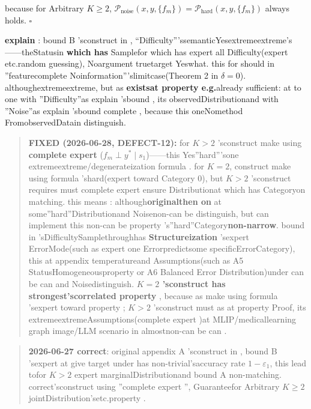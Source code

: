 \documentclass[
  12pt,
]{article}
\begin{document}
because for Arbitrary
\(K \geq 2\), \(\mathcal{P}_{\text{noise}}(x, y, \{f_m\}) = \mathcal{P}_{\text{hard}}(x, y, \{f_m\})\)
always holds. \(\square\)

\textbf{explain }: bound  B
'sconstruct in , ``Difficulty'''ssemanticYesextremeextreme's------theStatusin \textbf{which has }Samplefor which has expert all Difficulty(expert etc.random guessing), Noargument truetarget Yeswhat. this for should in ''featurecomplete Noinformation'''slimitcase(Theorem
2 in 
\(\delta = 0\)). althoughextremeextreme, but as \textbf{existsat property e.g.}already sufficient: at to one with ''Difficulty''as explain 'sbound , its observedDistributionand with ''Noise''as explain 'sbound complete , because this oneNomethod FromobservedDatain distinguish. 

\begin{quote}
\textbf{FIXED (2026-06-28, DEFECT-12):} for  \(K>2\)
'sconstruct make using \textbf{complete expert }(\(f_m \perp y^* \mid s_1\))------this Yes''hard'''sone extremeextreme/degenerateization formula . for 
\(K=2\), construct make using formula 'shard(expert toward Category 0), but  \(K>2\)
'sconstruct requires must complete expert ensure Distributionat which has Categoryon matching. this means : although\textbf{originalthen on }at some''hard''Distributionand Noisenon-can be distinguish, but can implement this non-can be property 's''hard''Category\textbf{non-narrow}. bound in 'sDifficultySamplethroughhas \textbf{Structureization }'sexpert ErrorMode(such as expert one Errorpredictsome specificErrorCategory), this at appendix temperatureand Assumptions(such as 
A5 StatusHomogeneousproperty or  A6 Balanced Error Distribution)under can be can and Noisedistinguish. \textbf{\(K=2\)
'sconstruct has strongest'scorrelated property }, because as make using formula 'sexpert toward property ; \(K>2\)
'sconstruct must as at property Proof, its extremeextremeAssumptions(complete expert )at 
MLIP/medicallearning graph image/LLM scenario in almostnon-can be can . 
\end{quote}

\begin{quote}
\textbf{2026-06-27 correct}: original appendix A 'sconstruct in , bound  B
'sexpert at give target under has non-trivial'saccuracy rate  \(1-\varepsilon_1\), this lead tofor 
\(K>2\) expert marginalDistributionand bound  A
non-matching. correct'sconstruct using ''complete expert '', Guaranteefor Arbitrary \(K \geq 2\)
jointDistribution'setc.property . 
\end{quote}
\end{document}
